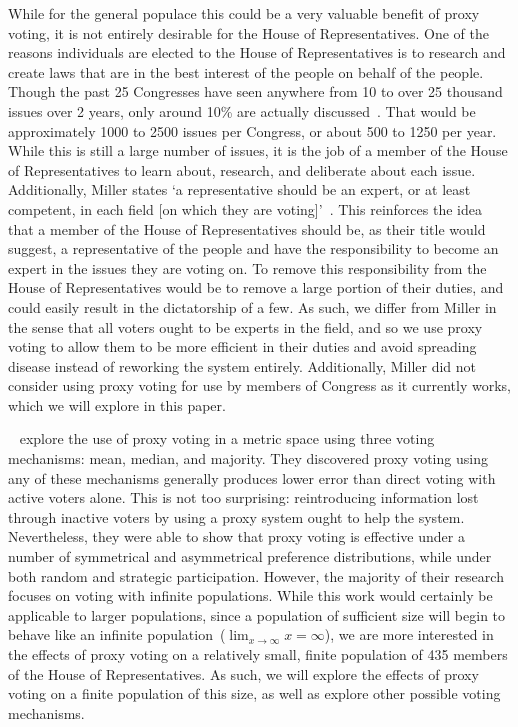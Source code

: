 While for the general populace this could be a very valuable benefit of proxy voting,
it is not entirely desirable for the House of Representatives.
One of the reasons individuals are elected to the House of Representatives is to
research and create laws that are in the best interest of the people on behalf of
the people.
Though the past 25 Congresses have seen anywhere from 10 to over 25 thousand issues
over 2 years, only around 10\% are actually discussed~\cite{GovTrack2022}.
That would be approximately 1000 to 2500 issues per Congress, or about 500 to 1250 per
year.
While this is still a large number of issues, it is the job of a member of the House
of Representatives to learn about, research, and deliberate about each issue.
Additionally, Miller states `a representative should be an expert, or at least
competent, in each field [on which they are voting]'~\cite{Miller1969}.
This reinforces the idea that a member of the House of Representatives should be, as
their title would suggest, a representative of the people and have the responsibility
to become an expert in the issues they are voting on.
To remove this responsibility from the House of Representatives would be to remove
a large portion of their duties, and could easily result in the dictatorship of a few.
As such, we differ from Miller in the sense that all voters ought to be experts in
the field, and so we use proxy voting to allow them to be more efficient in their
duties and avoid spreading disease instead of reworking the system entirely.
Additionally, Miller did not consider using proxy voting for use by members of
Congress as it currently works, which we will explore in this paper.

~\cite{Cohensius2017} explore the use of proxy voting in a metric space
using three voting mechanisms: mean, median, and majority.
They discovered proxy voting using any of these mechanisms generally produces lower
error than direct voting with active voters alone.
This is not too surprising: reintroducing information lost through inactive voters by
using a proxy system ought to help the system.
Nevertheless, they were able to show that proxy voting is effective under a number of
symmetrical and asymmetrical preference distributions, while under both random and
strategic participation.
However, the majority of their research focuses on voting with infinite populations.
While this work would certainly be applicable to larger populations, since a
population of sufficient size will begin to behave like an infinite
population~($\lim_{x \rightarrow \infty} x = \infty$), we are more interested in the
effects of proxy voting on a relatively small, finite population of 435 members of the
House of Representatives.
As such, we will explore the effects of proxy voting on a finite population of this
size, as well as explore other possible voting mechanisms.

